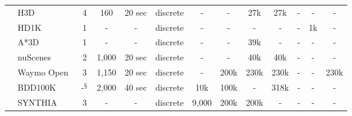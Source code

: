 \begin{table*}[!t]
\begin{tabular}{clccccccccccc}
& H3D~\cite{patil2019h3d}                                         & 4                                & 160                                 &    20 sec                                                & discrete                                      & -                    & -                    & 27k                  & 27k                  & -        & -                & -    \\
& HD1K~\cite{kondermann2016hci}                                   & 1                                & -                                   & -                                                  & discrete                                      & -                    & -                    & -                    & -                    & -        & 1k                 & -  \\
& A*3D~\cite{pham2020a3d}                                         & 1                                & -                                   & -                                                 & discrete                                      & -                    & -                    & 39k                  & -                    & -        & -                 & -   \\
& nuScenes~\cite{caesar2020nuscenes}                              & 2                                & 1,000                                & 20 sec                                            & discrete                                      & -                    & -                    & 40k                  & 40k                  & -        & -                 & -   \\
& Waymo Open~\cite{sun2020scalability}                            & 3                                & 1,150                                & 20 sec                                            & discrete                                      & -                    & 200k                 & 230k                 & 230k                 & -        & -          & 230k          \\
& BDD100K~\cite{bdd100k}                                          & -$^\mathsection$                         & 2,000                                & 40 sec                                           & discrete                                      & 10k                  & 100k                 & -                    & 318k                 & -        & -             & -       \\ \midrule
\parbox[t]{2mm}{} & SYNTHIA~\cite{ros2016synthia}                                   & 3                                & -                                   & -                                                  & discrete                                      & 9,000                 & 200k                 & 200k                 & -                    & -        & -               & -      \\ 

\end{tabular}
\end{table*}
